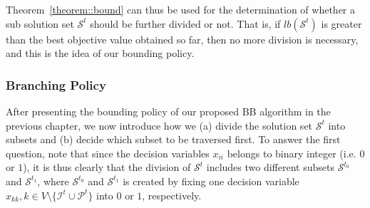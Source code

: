 Theorem~\ref{theorem::bound} can thus be used for the determination of whether a sub solution set $\mathcal{S}^t$ should be further divided or not.
That is, if $lb(\mathcal{S}^t)$ is greater than the best objective value obtained so far, then no more division is necessary, and this is the idea of our bounding policy.

\subsubsection{Branching Policy}
\label{sec::proposedBBBranchingPolicy}
After presenting the bounding policy of our proposed BB algorithm in the previous chapter, we now introduce how we (a) divide the solution set $\mathcal{S}^t$ into subsets and (b) decide which subset to be traversed first.
To answer the first question, note that since the decision variables $x_{ii}$ belongs to binary integer (i.e. $0$ or $1$), it is thus clearly that the division of $\mathcal{S}^t$ includes two different subsets $\mathcal{S}^{t_0}$ and $\mathcal{S}^{t_1}$, where  $\mathcal{S}^{t_0}$ and $\mathcal{S}^{t_1}$ is created by fixing one decision variable ${x_{kk},k \in V \setminus \{\mathcal{I}^t \cup \mathcal{P}^t\} }$ into $0$ or $1$, respectively.

